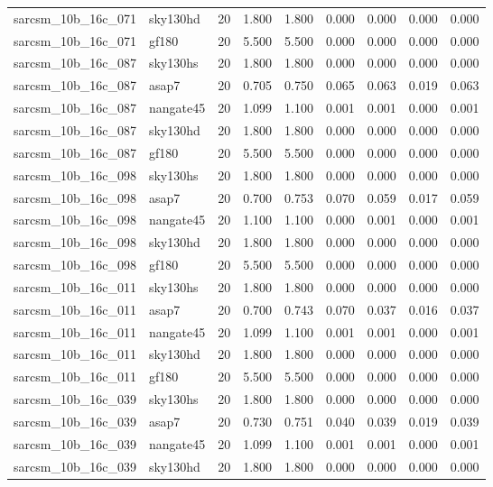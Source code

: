 \begin{tabular}{llrrrrrrr}
sarcsm\_10b\_16c\_071 & sky130hd & 20 & 1.800 & 1.800 & 0.000 & 0.000 & 0.000 & 0.000 \\
sarcsm\_10b\_16c\_071 & gf180 & 20 & 5.500 & 5.500 & 0.000 & 0.000 & 0.000 & 0.000 \\
sarcsm\_10b\_16c\_087 & sky130hs & 20 & 1.800 & 1.800 & 0.000 & 0.000 & 0.000 & 0.000 \\
sarcsm\_10b\_16c\_087 & asap7 & 20 & 0.705 & 0.750 & 0.065 & 0.063 & 0.019 & 0.063 \\
sarcsm\_10b\_16c\_087 & nangate45 & 20 & 1.099 & 1.100 & 0.001 & 0.001 & 0.000 & 0.001 \\
sarcsm\_10b\_16c\_087 & sky130hd & 20 & 1.800 & 1.800 & 0.000 & 0.000 & 0.000 & 0.000 \\
sarcsm\_10b\_16c\_087 & gf180 & 20 & 5.500 & 5.500 & 0.000 & 0.000 & 0.000 & 0.000 \\
sarcsm\_10b\_16c\_098 & sky130hs & 20 & 1.800 & 1.800 & 0.000 & 0.000 & 0.000 & 0.000 \\
sarcsm\_10b\_16c\_098 & asap7 & 20 & 0.700 & 0.753 & 0.070 & 0.059 & 0.017 & 0.059 \\
sarcsm\_10b\_16c\_098 & nangate45 & 20 & 1.100 & 1.100 & 0.000 & 0.001 & 0.000 & 0.001 \\
sarcsm\_10b\_16c\_098 & sky130hd & 20 & 1.800 & 1.800 & 0.000 & 0.000 & 0.000 & 0.000 \\
sarcsm\_10b\_16c\_098 & gf180 & 20 & 5.500 & 5.500 & 0.000 & 0.000 & 0.000 & 0.000 \\
sarcsm\_10b\_16c\_011 & sky130hs & 20 & 1.800 & 1.800 & 0.000 & 0.000 & 0.000 & 0.000 \\
sarcsm\_10b\_16c\_011 & asap7 & 20 & 0.700 & 0.743 & 0.070 & 0.037 & 0.016 & 0.037 \\
sarcsm\_10b\_16c\_011 & nangate45 & 20 & 1.099 & 1.100 & 0.001 & 0.001 & 0.000 & 0.001 \\
sarcsm\_10b\_16c\_011 & sky130hd & 20 & 1.800 & 1.800 & 0.000 & 0.000 & 0.000 & 0.000 \\
sarcsm\_10b\_16c\_011 & gf180 & 20 & 5.500 & 5.500 & 0.000 & 0.000 & 0.000 & 0.000 \\
sarcsm\_10b\_16c\_039 & sky130hs & 20 & 1.800 & 1.800 & 0.000 & 0.000 & 0.000 & 0.000 \\
sarcsm\_10b\_16c\_039 & asap7 & 20 & 0.730 & 0.751 & 0.040 & 0.039 & 0.019 & 0.039 \\
sarcsm\_10b\_16c\_039 & nangate45 & 20 & 1.099 & 1.100 & 0.001 & 0.001 & 0.000 & 0.001 \\
sarcsm\_10b\_16c\_039 & sky130hd & 20 & 1.800 & 1.800 & 0.000 & 0.000 & 0.000 & 0.000 \\

\end{tabular}
